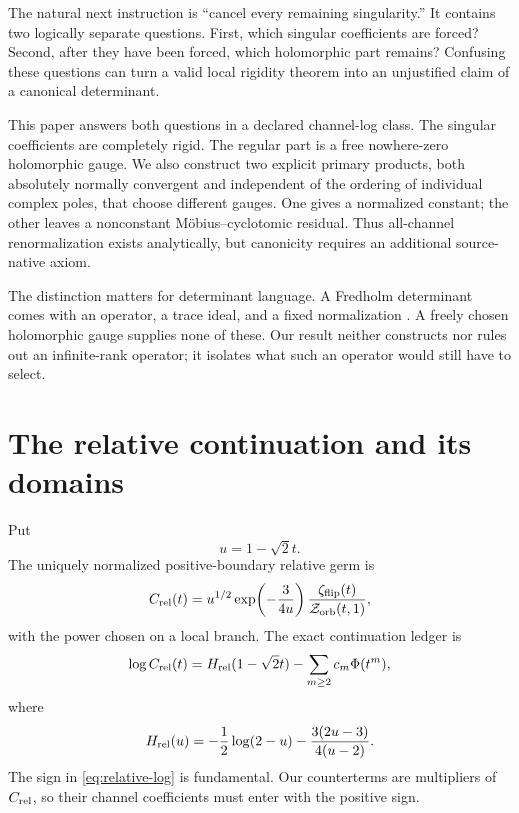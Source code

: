 \documentclass[11pt]{article}
\newcommand{\Zorb}{\mathcal Z_{\rm orb}}
\newcommand{\zflip}{\zeta_{\rm flip}}
\newcommand{\Crel}{C_{\rm rel}}
\begin{document}
The natural next instruction is ``cancel every remaining singularity.''  It
contains two logically separate questions.  First, which singular
coefficients are forced?  Second, after they have been forced, which
holomorphic part remains?  Confusing these questions can turn a valid local
rigidity theorem into an unjustified claim of a canonical determinant.

This paper answers both questions in a declared channel-log class.  The
singular coefficients are completely rigid.  The regular part is a free
nowhere-zero holomorphic gauge.  We also construct two explicit primary
products, both absolutely normally convergent and independent of the ordering
of individual complex poles, that choose different gauges.  One gives a
normalized constant; the other leaves a nonconstant M\"obius--cyclotomic
residual.  Thus all-channel renormalization exists analytically, but
canonicity requires an additional source-native axiom.

The distinction matters for determinant language.  A Fredholm determinant
comes with an operator, a trace ideal, and a fixed normalization
\cite{Simon1977}.  A freely chosen holomorphic gauge supplies none of these.
Our result neither constructs nor rules out an infinite-rank operator; it
isolates what such an operator would still have to select.

\section{The relative continuation and its domains}

Put
\begin{equation}\label{eq:u}
 u=1-\sqrt2t.
\end{equation}
The uniquely normalized positive-boundary relative germ is
\begin{equation}\label{eq:Crel-def}
 \Crel(t)=u^{1/2}\exp\!\left(-\frac{3}{4u}\right)
 \frac{\zflip(t)}{\Zorb(t,1)},
\end{equation}
with the power chosen on a local branch.  The exact continuation ledger is
\begin{equation}\label{eq:relative-log}
 \log\Crel(t)=H_{\rm rel}(1-\sqrt2t)
 -\sum_{m\ge2}c_m\Phi(t^m),
\end{equation}
where
\begin{equation}\label{eq:H}
 H_{\rm rel}(u)=-\frac12\log(2-u)
 -\frac{3(2u-3)}{4(u-2)}.
\end{equation}
The sign in \cref{eq:relative-log} is fundamental.  Our counterterms are
multipliers of \(\Crel\), so their channel coefficients must enter with the
positive sign.
\end{document}
